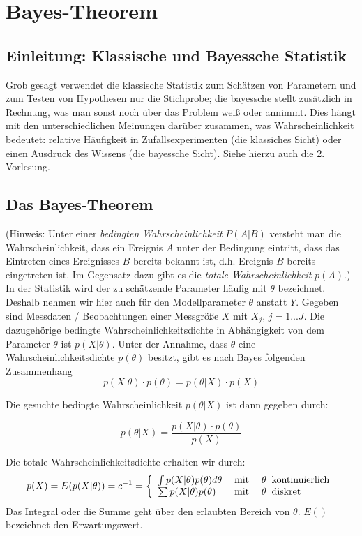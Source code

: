
\section{Bayes-Theorem}
\subsection{Einleitung: Klassische und Bayessche Statistik}
Grob gesagt verwendet die klassische Statistik zum Schätzen von Parametern
und zum Testen von Hypothesen nur die Stichprobe; die bayessche stellt zusätzlich in Rechnung, was man sonst noch über das Problem weiß oder
annimmt. Dies hängt mit den unterschiedlichen Meinungen darüber zusammen,
was Wahrscheinlichkeit bedeutet: relative Häufigkeit in Zufallsexperimenten
(die klassiches Sicht) oder einen Ausdruck des Wissens (die bayessche Sicht). Siehe hierzu auch die 2. Vorlesung.

\subsection{Das Bayes-Theorem}
(Hinweis: Unter einer \textit{bedingten Wahrscheinlichkeit} $P(A|B)$ versteht man die Wahrscheinlichkeit, dass ein Ereignis $A$ unter der Bedingung eintritt, dass das Eintreten eines Ereignisses $B$ bereits bekannt ist, d.h. Ereignis $B$ bereits eingetreten ist.
Im Gegensatz dazu gibt es die \textit{totale Wahrscheinlichkeit} $p(A)$.)\\
In der Statistik wird der zu schätzende Parameter häufig mit $\theta$ bezeichnet. Deshalb nehmen wir hier auch für
den Modellparameter $\theta$ anstatt $Y$.
Gegeben sind Messdaten / Beobachtungen einer Messgröße $X$ mit $X_j$, $j=1...J$. Die dazugehörige bedingte
Wahrscheinlichkeitsdichte in Abhängigkeit von dem Parameter $\theta$ ist $p(X|\theta)$. Unter der Annahme, dass $\theta$ eine Wahrscheinlichkeitsdichte
$p(\theta)$ besitzt, gibt es nach Bayes folgenden Zusammenhang
\begin{equation}
p(X|\theta)\cdot p(\theta) = p(\theta | X) \cdot p(X)
\end{equation}

Die gesuchte bedingte Wahrscheinlichkeit $p(\theta | X)$ ist dann
gegeben durch:

\begin{equation}
p(\theta | X) = \frac{p(X|\theta)\cdot p(\theta)}{p(X)}
\label{eq:BayesTheorem}
\end{equation}

Die totale Wahrscheinlichkeitsdichte erhalten wir durch:
\begin{equation}
p(X) = E(p(X|\theta)) = c^{-1} = \left\lbrace {
	\begin{array}{l l l}
	\int p(X|\theta) p(\theta) d \theta &\;\mathrm{mit} \; & \theta \;\; \mathrm{kontinuierlich} \\
	\sum  p(X|\theta) p(\theta) &\;\mathrm{mit} \; & \theta \;\; \mathrm{diskret} \\
	\end{array}
 } \right .
\end{equation}
Das Integral oder die Summe geht über den erlaubten Bereich von $\theta$. $E()$ bezeichnet den Erwartungswert.


